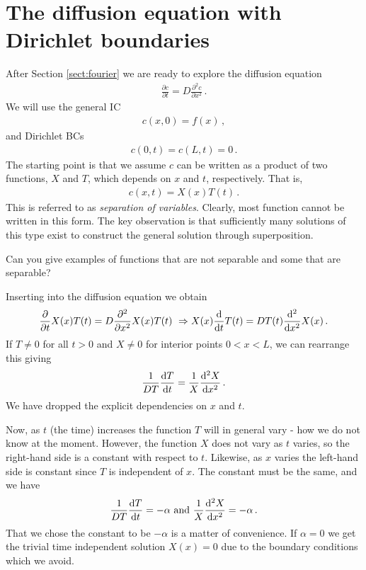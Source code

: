 \section{The diffusion equation with Dirichlet boundaries}
After Section \ref{sect:fourier} we are ready to explore the diffusion equation
\begin{eqnarray}
	\frac{\partial c}{\partial t} = D\frac{\partial^2c}{\partial x^2} \, .
\end{eqnarray}
We will use the general IC 
\begin{eqnarray}
	c(x, 0) = f(x) \, ,
\end{eqnarray}
and Dirichlet BCs 
\begin{eqnarray}
	\label{eq:bcstart}
	c(0, t) = c(L,t) = 0 \, .
\end{eqnarray}
The starting point is that we assume $c$ can be written as a product of two functions, 
$X$ and $T$, which depends on $x$ and $t$, respectively. That is,
\begin{eqnarray}
	c(x,t) = X(x)T(t) \, .
\end{eqnarray}
This is referred to as \emph{separation of variables}. 
Clearly, most function cannot be written in this form. The key observation is that 
sufficiently many solutions of this type exist to construct the general solution through superposition.
\begin{question}
Can you give examples of functions that are not separable and some that are separable?
\end{question}

\noindent Inserting into the diffusion equation we obtain
\begin{eqnarray}
	\frac{\partial}{\partial t} X(x)T(t) = D \frac{\partial^2}{\partial x^2} X(x) T(t) \ \Rightarrow 
	X(x) \frac{\mathrm{d}}{\mathrm{d} t} T(t) = D T(t) \frac{\mathrm{d}^2}{\mathrm{d} x^2} X(x)  \, .
\end{eqnarray}
If $T \neq 0$ for all $t>0$ and $X \neq 0$ for interior points $0 < x < L$, we can rearrange this giving
\begin{eqnarray}
	\frac{1}{D T} \frac{\mathrm{d} T}{\mathrm{d} t} = \frac{1}{X}\frac{\mathrm{d}^2X}{\mathrm{d} x^2} \, .
\end{eqnarray}
We have dropped the explicit dependencies on $x$ and $t$. 

Now, as $t$ (the time) increases the function $T$ will in general vary - how we do not know at the moment. 
However, the function $X$ does not vary as $t$ varies, so the right-hand side is a constant 
with respect to $t$. Likewise, as $x$ varies the left-hand side is constant since $T$ is independent of $x$. 
The constant must be the same, and we have
\begin{eqnarray}
	\frac{1}{D T} \frac{\d T}{\d t} = -\alpha  \ \text{and} \ \frac{1}{X}\frac{\d^2X}{\d x^2} = -\alpha\, .
\end{eqnarray}
That we chose the constant to be $-\alpha$ is a matter of convenience. If
$\alpha = 0$ we get the trivial time independent solution $X(x) = 0$ due to the
boundary conditions which we avoid. 

